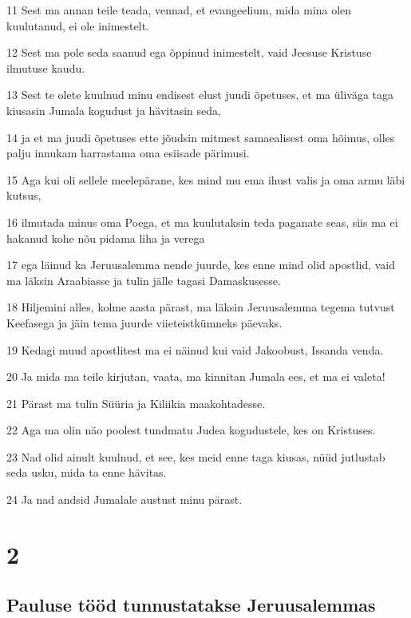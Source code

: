 \par 11 Sest ma annan teile teada, vennad, et evangeelium, mida mina olen kuulutanud, ei ole inimestelt.
\par 12 Sest ma pole seda saanud ega õppinud inimestelt, vaid Jeesuse Kristuse ilmutuse kaudu.
\par 13 Sest te olete kuulnud minu endisest elust juudi õpetuses, et ma üliväga taga kiusasin Jumala kogudust ja hävitasin seda,
\par 14 ja et ma juudi õpetuses ette jõudsin mitmest samaealisest oma hõimus, olles palju innukam harrastama oma esiisade pärimusi.
\par 15 Aga kui oli sellele meelepärane, kes mind mu ema ihust valis ja oma armu läbi kutsus,
\par 16 ilmutada minus oma Poega, et ma kuulutaksin teda paganate seas, siis ma ei hakanud kohe nõu pidama liha ja verega
\par 17 ega läinud ka Jeruusalemma nende juurde, kes enne mind olid apostlid, vaid ma läksin Araabiasse ja tulin jälle tagasi Damaskusesse.
\par 18 Hiljemini alles, kolme aasta pärast, ma läksin Jeruusalemma tegema tutvust Keefasega ja jäin tema juurde viieteistkümneks päevaks.
\par 19 Kedagi muud apostlitest ma ei näinud kui vaid Jakoobust, Issanda venda.
\par 20 Ja mida ma teile kirjutan, vaata, ma kinnitan Jumala ees, et ma ei valeta!
\par 21 Pärast ma tulin Süüria ja Kiliikia maakohtadesse.
\par 22 Aga ma olin näo poolest tundmatu Judea kogudustele, kes on Kristuses.
\par 23 Nad olid ainult kuulnud, et see, kes meid enne taga kiusas, nüüd jutlustab seda usku, mida ta enne hävitas.
\par 24 Ja nad andsid Jumalale austust minu pärast.


\chapter{2}

\section*{Pauluse tööd tunnustatakse Jeruusalemmas}

